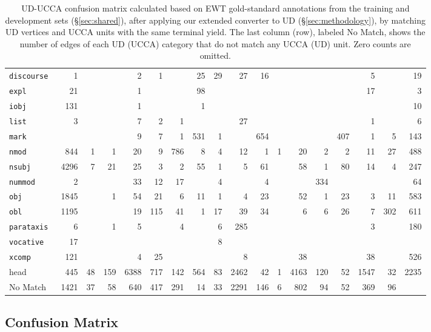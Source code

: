 \documentclass[11pt,a4paper,table]{article}
\begin{document}
\begin{table*}[t]
{\begin{tabular}{lRRRRRRRRRRRRRRRR|R}
\tt discourse & 1 &  &  & 2 & 1 &  & 25 & 29 & 27 & 16 &  &  &  &  & 5 &  & 19 \\
\tt expl & 21 &  &  & 1 &  &  & 98 &  &  &  &  &  &  &  & 17 &  & 3 \\
\tt iobj & 131 &  &  & 1 &  &  & 1 &  &  &  &  &  &  &  &  &  & 10 \\
\tt list & 3 &  &  & 7 & 2 & 1 &  &  & 27 &  &  &  &  &  & 1 &  & 6 \\
\tt mark &  &  &  & 9 & 7 & 1 & 531 & 1 &  & 654 &  &  &  & 407 & 1 & 5 & 143 \\
\tt nmod & 844 & 1 & 1 & 20 & 9 & 786 & 8 & 4 & 12 & 1 & 1 & 20 & 2 & 2 & 11 & 27 & 488 \\
\tt nsubj & 4296 & 7 & 21 & 25 & 3 & 2 & 55 & 1 & 5 & 61 &  & 58 & 1 & 80 & 14 & 4 & 247 \\
\tt nummod & 2 &  &  & 33 & 12 & 17 &  & 4 &  & 4 &  &  & 334 &  &  &  & 64 \\
\tt obj & 1845 &  & 1 & 54 & 21 & 6 & 11 & 1 & 4 & 23 &  & 52 & 1 & 23 & 3 & 11 & 583 \\
\tt obl & 1195 &  &  & 19 & 115 & 41 & 1 & 17 & 39 & 34 &  & 6 & 6 & 26 & 7 & 302 & 611 \\
\tt parataxis & 6 &  & 1 & 5 &  & 4 &  & 6 & 285 &  &  &  &  &  & 3 &  & 180 \\
\tt vocative & 17 &  &  &  &  &  &  & 8 &  &  &  &  &  &  &  &  &  \\
\tt xcomp & 121 &  &  & 4 & 25 &  &  &  & 8 &  &  & 38 &  &  & 38 &  & 526 \\
\hline
head & 445 & 48 & 159 & 6388 & 717 & 142 & 564 & 83 & 2462 & 42 & 1 & 4163 & 120 & 52 & 1547 & 32 & 2235 \\
\hline
\sc No Match & 1421 & 37 & 58 & 640 & 417 & 291 & 14 & 33 & 2291 & 146 & 6 & 802 & 94 & 52 & 369 & 96 & 
\end{tabular}
}
\caption{UD-UCCA confusion matrix calculated based on EWT
gold-standard annotations from the training and development sets
(\S\ref{sec:shared}),
after applying our extended converter to UD (\S\ref{sec:methodology}),
by matching UD vertices and UCCA units with the same terminal yield.
The last column (row), labeled {\sc No Match}, shows the number of edges of each UD (UCCA) category
that do not match any UCCA (UD) unit.
Zero counts are omitted.\label{tab:confusion_matrix}}
\end{table*}

\subsection{Confusion Matrix}\label{sec:confusion}
\end{document}
